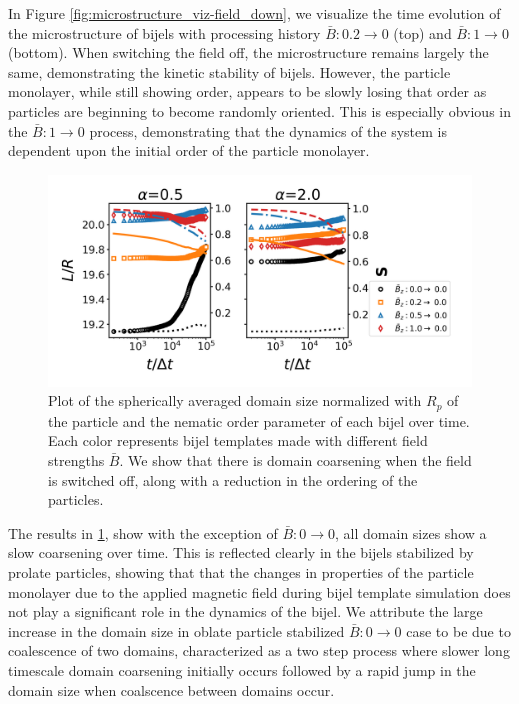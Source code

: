 In Figure \ref{fig:microstructure_viz-field_down}, we visualize the time
evolution of the microstructure of bijels with processing history
$\bar{B}:0.2 \rightarrow 0$ (top) and $\bar{B}:1 \rightarrow 0$
(bottom). When switching the field off, the microstructure
remains largely the same, demonstrating the kinetic stability of bijels.
However, the particle monolayer, while still showing order, appears to
be slowly losing that order as particles are beginning to become
randomly oriented. This is especially obvious in the
$\bar{B}:1 \rightarrow 0$ process, demonstrating that the dynamics of
the system is dependent upon the initial order of the particle
monolayer.

\begin{figure} 
\centering 
\includegraphics[scale=0.5]{../figures/results/paper2/domain_size-field_down.png} 
\caption{Plot of the spherically averaged domain size normalized with $R_p$ of the particle and the nematic order parameter of each bijel over time. 
         Each color represents bijel templates made with different field strengths $\bar{B}$. We show that there is domain coarsening when the field 
         is switched off, along with a reduction in the ordering of the particles.} 
\label{fig:domain_size-field_down} 
\end{figure}

The results in \ref{fig:domain_size-field_down}, show with the exception of $\bar{B}:0\rightarrow0$, all
domain sizes show a slow coarsening over time. This is reflected clearly
in the bijels stabilized by prolate particles, showing that that the
changes in properties of the particle monolayer due to the applied
magnetic field during bijel template simulation does not play a
significant role in the dynamics of the bijel. We attribute the large
increase in the domain size in oblate particle stabilized
$\bar{B}:0\rightarrow0$ case to be due to coalescence of two
domains, characterized as a two step process where slower long
timescale domain coarsening initially occurs followed by a rapid jump in the
domain size when coalscence between domains occur.


